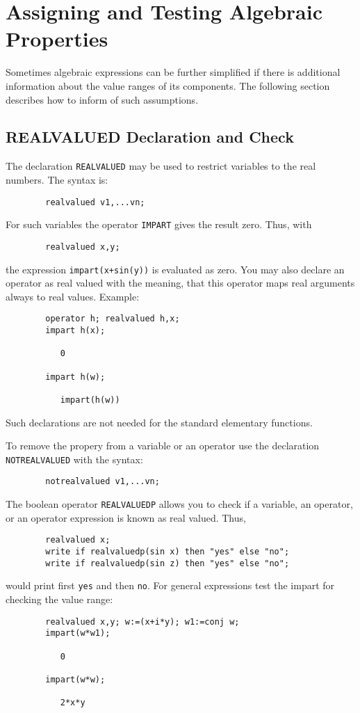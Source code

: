 \chapter{Assigning and Testing Algebraic Properties}

Sometimes algebraic expressions can be further simplified if
there is additional information about the value ranges
of its components. The following section describes 
how to inform {\REDUCE} of such assumptions.


\section{REALVALUED Declaration and Check}
\hypertarget{command:REALVALUED}{}
\hypertarget{command:NOTREALVALUED}{}

The declaration \texttt{REALVALUED} may be used 
to restrict variables to the real numbers. The syntax is:
\begin{verbatim}
        realvalued v1,...vn;
\end{verbatim}
For such variables the operator \texttt{IMPART} gives 
the result zero. Thus, with
\begin{verbatim}
        realvalued x,y;
\end{verbatim}
the expression \verb;impart(x+sin(y)); is evaluated as zero.
You may also declare an operator as real valued
with the meaning, that this operator maps real arguments always to
real values. Example:
\begin{verbatim}
        operator h; realvalued h,x;
        impart h(x);
   
           0
  
        impart h(w);

           impart(h(w))
\end{verbatim}
Such declarations are not needed for the standard elementary functions.
        
To remove the propery from a variable or an operator use the declaration
\texttt{NOTREALVALUED} with the syntax:
\begin{verbatim}
        notrealvalued v1,...vn;
\end{verbatim}

\hypertarget{operator:REALVALUEDP}{}
The boolean operator \texttt{REALVALUEDP}
allows you to check if a variable, an operator, or
an operator expression is known as real valued.
Thus, 
\begin{verbatim}
        realvalued x;
        write if realvaluedp(sin x) then "yes" else "no";
        write if realvaluedp(sin z) then "yes" else "no";
\end{verbatim}
would print first \verb+yes+ and then \verb+no+. For general
expressions test the impart for checking the value range:
\begin{verbatim}
        realvalued x,y; w:=(x+i*y); w1:=conj w;
        impart(w*w1);

           0

        impart(w*w);

           2*x*y
\end{verbatim}

